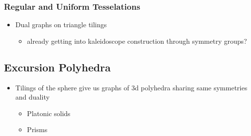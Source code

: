 \subsubsection{Regular and Uniform
Tesselations}\label{regular-and-uniform-tesselations}

\begin{itemize}
\tightlist
\item[$\square$]
  Dual graphs on triangle tilings

  \begin{itemize}
  \tightlist
  \item[$\square$]
    already getting into kaleidoscope construction through symmetry
    groups?
  \end{itemize}
\end{itemize}

\subsection{Excursion Polyhedra}\label{excursion-polyhedra}

\begin{itemize}
\tightlist
\item[$\square$]
  Tilings of the sphere give us graphs of 3d polyhedra sharing same
  symmetries and duality

  \begin{itemize}
  \tightlist
  \item[$\square$]
    Platonic solids
  \item[$\square$]
    Prisms
  \end{itemize}
\end{itemize}
